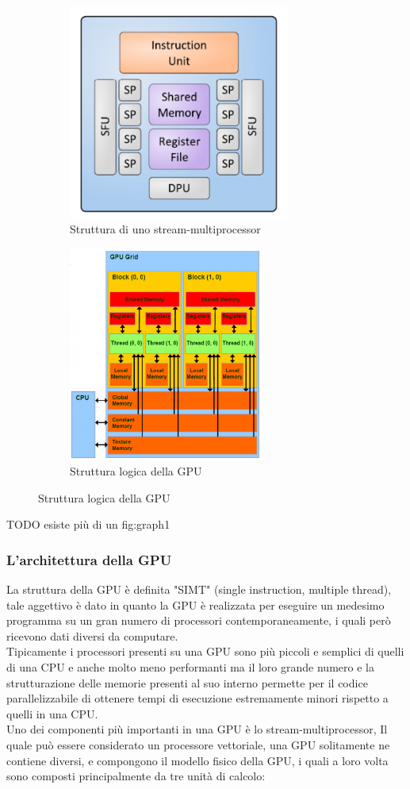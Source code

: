 \documentclass[10pt,a4paper]{article}
\begin{document}
\begin{figure}[h!]
  \centering
  \begin{subfigure}[t]{0.45\linewidth}
  	\centering
    \includegraphics[height=200pt]{SM.png}
    \caption*{Struttura di uno stream-multiprocessor}
  \end{subfigure}
  \begin{subfigure}[t]{0.45\linewidth}
  	\centering
    \includegraphics[height=200pt]{LogicModel.png}
    \caption*{Struttura logica della GPU}
  \end{subfigure}
  \label{fig:graph1}
\end{figure}

TODO esiste pi\`u di un fig:graph1

\subsubsection{L'architettura della GPU}
La struttura della GPU è definita "SIMT" (single instruction, multiple thread), tale aggettivo è dato in quanto la GPU è realizzata per eseguire un medesimo programma su un gran numero di processori contemporaneamente, i quali però ricevono dati diversi da computare.\\ Tipicamente i processori presenti su una GPU sono più piccoli e semplici di quelli di una CPU e anche molto meno performanti ma il loro grande numero e la strutturazione delle memorie presenti al suo interno permette per il codice parallelizzabile di ottenere tempi di esecuzione estremamente minori rispetto a quelli in una CPU.\\
Uno dei componenti più importanti in una GPU è lo stream-multiprocessor, Il quale  può essere considerato un processore vettoriale, una GPU solitamente ne contiene diversi, e compongono il modello fisico della GPU, i quali a loro volta sono composti principalmente da tre  unità di calcolo: 
\end{document}

